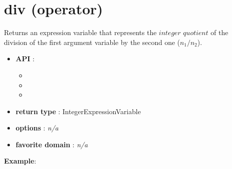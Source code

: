 \label{div}
\hypertarget{div}{}

\section{div (operator)}\label{div:divoperator}\hypertarget{div:divoperator}{}
Returns an expression variable that represents the \(integer\) \(quotient\) of the division of the first argument variable by the second one (\(n_1/n_2\)).

\begin{itemize}
	\item \textbf{API} :
	\begin{itemize}
		\item {}
		\item {}
		\item {}
	\end{itemize}
	\item \textbf{return type} : IntegerExpressionVariable
	\item \textbf{options} : \emph{n/a}
	\item \textbf{favorite domain} : \emph{n/a}
\end{itemize}

\textbf{Example}:

